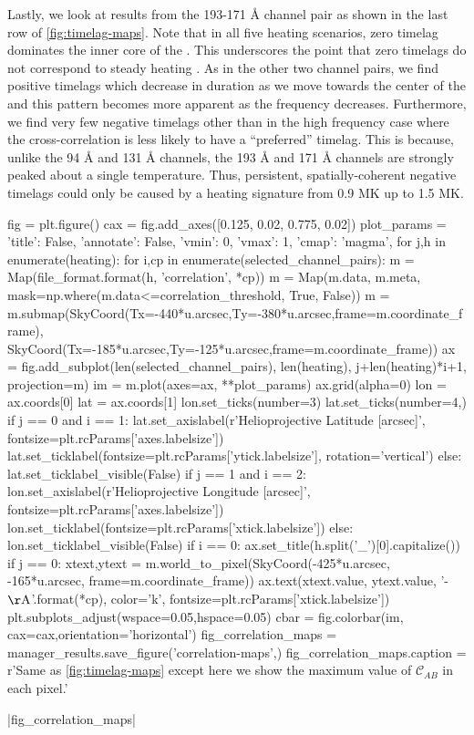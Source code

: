 Lastly, we look at results from the 193-171 \AA{} channel pair as shown in the last row of \autoref{fig:timelag-maps}. Note that in all five heating scenarios, zero timelag dominates the inner core of the \AR{}. This underscores the point that zero timelags do not correspond to steady heating \citep[see][]{viall_transition_2015,viall_signatures_2016}. As in the other two channel pairs, we find positive timelags which decrease in duration as we move towards the center of the \AR{} and this pattern becomes more apparent as the frequency decreases. Furthermore, we find very few negative timelags other than in the high frequency case where the cross-correlation is less likely to have a ``preferred'' timelag. This is because, unlike the 94 \AA{} and 131 \AA{} channels, the 193 \AA{} and 171 \AA{} channels are strongly peaked about a single temperature. Thus, persistent, spatially-coherent negative timelags could only be caused by a heating signature from 0.9 MK up to 1.5 MK. 

\begin{pycode}
fig = plt.figure()
cax = fig.add_axes([0.125, 0.02, 0.775, 0.02])
plot_params = {'title': False, 'annotate': False, 'vmin': 0, 'vmax': 1, 'cmap': 'magma',}
for j,h in enumerate(heating):
    for i,cp in enumerate(selected_channel_pairs):
        m = Map(file_format.format(h, 'correlation', *cp))
        m = Map(m.data, m.meta, mask=np.where(m.data<=correlation_threshold, True, False))
        m = m.submap(SkyCoord(Tx=-440*u.arcsec,Ty=-380*u.arcsec,frame=m.coordinate_frame),
                        SkyCoord(Tx=-185*u.arcsec,Ty=-125*u.arcsec,frame=m.coordinate_frame))
        ax = fig.add_subplot(len(selected_channel_pairs), len(heating), j+len(heating)*i+1,
                                projection=m)
        im = m.plot(axes=ax, **plot_params)
        ax.grid(alpha=0)
        lon = ax.coords[0]
        lat = ax.coords[1]
        lon.set_ticks(number=3)
        lat.set_ticks(number=4,) 
        if j == 0 and i == 1:
            lat.set_axislabel(r'Helioprojective Latitude [arcsec]', fontsize=plt.rcParams['axes.labelsize'])
            lat.set_ticklabel(fontsize=plt.rcParams['ytick.labelsize'], rotation='vertical')
        else:
            lat.set_ticklabel_visible(False)
        if j == 1 and i == 2:
            lon.set_axislabel(r'Helioprojective Longitude [arcsec]', fontsize=plt.rcParams['axes.labelsize'])
            lon.set_ticklabel(fontsize=plt.rcParams['xtick.labelsize'])
        else:
            lon.set_ticklabel_visible(False)
        if i == 0:
            ax.set_title(h.split('_')[0].capitalize())
        if j == 0:
            xtext,ytext = m.world_to_pixel(SkyCoord(-425*u.arcsec, -165*u.arcsec, frame=m.coordinate_frame))
            ax.text(xtext.value, ytext.value, '{}-{} $\mathrm{{\AA}}$'.format(*cp),
                    color='k', fontsize=plt.rcParams['xtick.labelsize'])
plt.subplots_adjust(wspace=0.05,hspace=0.05)
cbar = fig.colorbar(im, cax=cax,orientation='horizontal')
fig_correlation_maps = manager_results.save_figure('correlation-maps',)
fig_correlation_maps.caption = r'Same as \autoref{fig:timelag-maps} except here we show the maximum value of $\mathcal{C}_{AB}$ in each pixel.'
\end{pycode}
|fig_correlation_maps|

